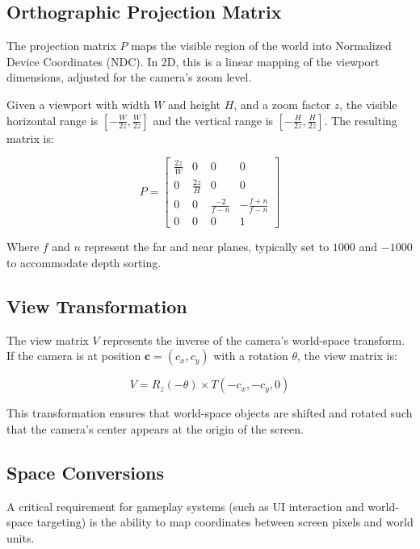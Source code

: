\subsection{Orthographic Projection Matrix}

The projection matrix $P$ maps the visible region of the world into Normalized Device Coordinates (NDC). In 2D, this is a linear mapping of the viewport dimensions, adjusted for the camera's zoom level.

Given a viewport with width $W$ and height $H$, and a zoom factor $z$, the visible horizontal range is $[- \frac{W}{2z}, \frac{W}{2z}]$ and the vertical range is $[- \frac{H}{2z}, \frac{H}{2z}]$. The resulting matrix is:

\begin{equation}
P = \begin{bmatrix}
\frac{2z}{W} & 0 & 0 & 0 \\
0 & \frac{2z}{H} & 0 & 0 \\
0 & 0 & \frac{-2}{f-n} & -\frac{f+n}{f-n} \\
0 & 0 & 0 & 1
\end{bmatrix}
\end{equation}

Where $f$ and $n$ represent the far and near planes, typically set to $1000$ and $-1000$ to accommodate depth sorting.

\subsection{View Transformation}

The view matrix $V$ represents the inverse of the camera's world-space transform. If the camera is at position $\mathbf{c} = (c_x, c_y)$ with a rotation $\theta$, the view matrix is:

\begin{equation}
V = R_z(-\theta) \times T(-c_x, -c_y, 0)
\end{equation}

This transformation ensures that world-space objects are shifted and rotated such that the camera's center appears at the origin of the screen.

\subsection{Space Conversions}

A critical requirement for gameplay systems (such as UI interaction and world-space targeting) is the ability to map coordinates between screen pixels and world units.

